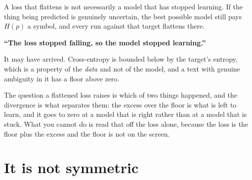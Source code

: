 \begin{fr}

A loss that flattens is not necessarily a model that has stopped learning.
If the thing being predicted is genuinely uncertain, the best possible model
still pays $H(p)$ a symbol, and every run against that target flattens there.

\begin{trapbox}
\textbf{\enquote{The loss stopped falling, so the model stopped learning.}}

It may have arrived. Cross-entropy is bounded below by the target's entropy,
which is a property of the \emph{data} and not of the model, and a text with
genuine ambiguity in it has a floor above zero.

The question a flattened loss raises is which of two things happened, and the
divergence is what separates them: the excess over the floor is what is left
to learn, and it goes to zero at a model that is right rather than at a model
that is stuck. What you cannot do is read that off the loss alone, because
the loss is the floor plus the excess and the floor is not on the screen.
\end{trapbox}
\end{fr}

\section{It is not symmetric}
\label{sec:P30-asymmetry}

